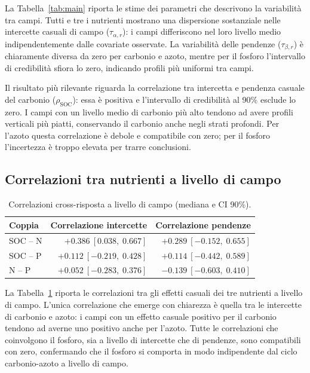 \documentclass[11pt, a4paper]{article}
\newcommand{\CI}[2]{[#1,\;#2]}
\newcommand{\tauA}[1]{\tau_{\alpha,#1}}
\newcommand{\tauB}[1]{\tau_{\beta,#1}}
\begin{document}
La Tabella~\ref{tab:main} riporta le stime dei parametri che descrivono la variabilità tra campi. Tutti e tre i nutrienti mostrano una dispersione sostanziale nelle intercette casuali di campo ($\tauA{r}$): i campi differiscono nel loro livello medio indipendentemente dalle covariate osservate. La variabilità delle pendenze ($\tauB{r}$) è chiaramente diversa da zero per carbonio e azoto, mentre per il fosforo l'intervallo di credibilità sfiora lo zero, indicando profili più uniformi tra campi.

Il risultato più rilevante riguarda la correlazione tra intercetta e pendenza casuale del carbonio ($\rho_{\mathrm{SOC}}$): essa è positiva e l'intervallo di credibilità al 90\% esclude lo zero. I campi con un livello medio di carbonio più alto tendono ad avere profili verticali più piatti, conservando il carbonio anche negli strati profondi. Per l'azoto questa correlazione è debole e compatibile con zero; per il fosforo l'incertezza è troppo elevata per trarre conclusioni.

\subsection{Correlazioni tra nutrienti a livello di campo}

\begin{table}[htbp]
\centering
\caption{Correlazioni cross-risposta a livello di campo (mediana e CI 90\%).}
\label{tab:cross_corr}
\small
\begin{tabular}{@{}lrr@{}}
\toprule
Coppia & Correlazione intercette & Correlazione pendenze \\
\midrule

SOC -- N &
$\mathbf{+0.386}\ \CI{0.038}{0.667}$ &
$+0.289\ \CI{-0.152}{0.655}$ \\[2pt]

SOC -- P &
$+0.112\ \CI{-0.219}{0.428}$ &
$+0.114\ \CI{-0.442}{0.589}$ \\[2pt]

N -- P &
$+0.052\ \CI{-0.283}{0.376}$ &
$-0.139\ \CI{-0.603}{0.410}$ \\

\bottomrule
\end{tabular}
\end{table}

La Tabella~\ref{tab:cross_corr} riporta le correlazioni tra gli effetti casuali dei tre nutrienti a livello di campo. L'unica correlazione che emerge con chiarezza è quella tra le intercette di carbonio e azoto: i campi con un effetto casuale positivo per il carbonio tendono ad averne uno positivo anche per l'azoto. Tutte le correlazioni che coinvolgono il fosforo, sia a livello di intercette che di pendenze, sono compatibili con zero, confermando che il fosforo si comporta in modo indipendente dal ciclo carbonio-azoto a livello di campo.
\end{document}
